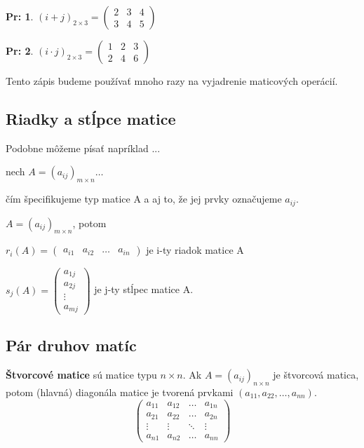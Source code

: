 \documentclass[12pt, a4paper]{article}
\theoremstyle{definition}
\newtheorem*{example}{Pr:}
\begin{document}
\begin{example}
$(i+j)_{2 \times 3} = \begin{pmatrix} 2 & 3 & 4 \\ 3 & 4 & 5 \end{pmatrix}$
\end{example}

\begin{example}
$(i \cdot j)_{2 \times 3} = \begin{pmatrix} 1 & 2 & 3 \\ 2 & 4 & 6 \end{pmatrix}$
\end{example}

Tento zápis budeme používať mnoho razy na vyjadrenie maticových operácií.

\subsection*{Riadky a stĺpce matice}
Podobne môžeme písať napríklad ...

nech $A = (a_{ij})_{m \times n} \dots$

čím špecifikujeme typ matice A a aj to, že jej prvky označujeme $a_{ij}$.

$A = (a_{ij})_{m \times n}$, potom

$r_i(A) = \begin{pmatrix} a_{i1} & a_{i2} & \dots & a_{in} \end{pmatrix}$
je i-ty riadok matice A

$s_j(A) = \begin{pmatrix} a_{1j} \\ a_{2j} \\ \vdots \\ a_{mj} \end{pmatrix}$
je j-ty stĺpec matice A.

\subsection*{Pár druhov matíc}
\textbf{Štvorcové matice} sú matice typu $n \times n$. Ak $A = (a_{ij})_{n \times n}$ je štvorcová matica, potom (hlavná) diagonála matice je tvorená prvkami $(a_{11}, a_{22}, \dots, a_{nn})$.
\[ \begin{pmatrix} a_{11} & a_{12} & \dots & a_{1n} \\ a_{21} & a_{22} & \dots & a_{2n} \\ \vdots & \vdots & \ddots & \vdots \\ a_{n1} & a_{n2} & \dots & a_{nn} \end{pmatrix} \]
\end{document}
